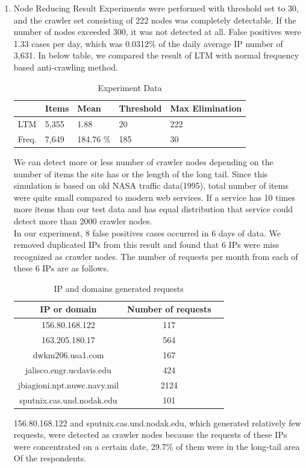 \documentclass[sigconf,anonymous=true]{acmart}
\begin{document}
\begin{enumerate}
\item Node Reducing Result
\newline 
Experiments were performed with threshold set to 30, and the crawler set consisting of 222 nodes was completely detectable. If the number of nodes exceeded 300, it was not detected at all. False positives were 1.33 cases per day, which was 0.0312\% of the daily average IP number of 3,631. In below table, we compared the result of LTM with normal frequency based anti-crawling method.

\begin{table}[H]
  \caption{Experiment Data}
    \begin{tabular}{| l | l | l | l | l | }
    \hline
    & Items & Mean & Threshold & Max Elimination \\ \hline
    LTM & 5,355 & 1.88 & 20 & 222 \\ 
    Freq. & 7,649 & 184.76 \% & 185 & 30 \\ \hline
    \end{tabular}
\end{table}

We can detect more or less number of crawler nodes depending on the number of items the site has or the length of the long tail. Since this simulation is based on old NASA traffic data(1995), total number of items were quite small compared to modern web services. If a service has 10 times more items than our test data and has equal distribution that service could detect more than 2000 crawler nodes.\\
In our experiment, 8 false positives cases occurred in 6 days of data. We removed duplicated IPs from this result and found that 6 IPs were miss recognized as crawler nodes. The number of requests per month from each of these 6 IPs are as follows. 


\begin{table}[H]
  \caption{IP and domains generated requests}
  \label{tab:freq}
  \begin{tabular}{ccl}
    \toprule
    IP or domain&Number of requests\\
    \midrule
    156.80.168.122 & 117\\
    163.205.180.17 & 564\\
    dwkm206.usa1.com & 167\\
    jalisco.engr.ucdavis.edu & 424\\
    jbiagioni.npt.nuwc.navy.mil & 2124\\
    sputnix.cas.und.nodak.edu & 101\\
  \bottomrule
\end{tabular}
\end{table}


156.80.168.122 and sputnix.cas.und.nodak.edu, which generated relatively few requests, were detected as crawler nodes because the requests of these IPs were concentrated on a certain date, 29.7\% of them were in the long-tail area Of the respondents.

\end{enumerate}
\end{document}
